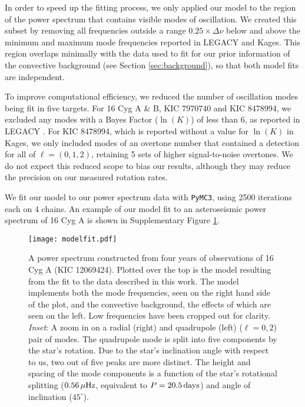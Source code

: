 In order to speed up the fitting process, we only applied our model to the region of the power spectrum that contains visible modes of oscillation. We created this subset by removing all frequencies outside a range $0.25 \times \Delta\nu$ below and above the minimum and maximum mode frequencies reported in LEGACY and Kages. This region overlaps minimally with the data used to fit for our prior information of the convective background (see Section \ref{sec:background}), so that both model fits are independent.

To improve computational efficiency, we reduced the number of oscillation modes being fit in five targets. For 16 Cyg A \& B, KIC 7970740 and KIC 8478994, we excluded any modes with a Bayes Factor ($\ln(K)$) of less than 6, as reported in LEGACY \cite{davies+2016,lund+2017,kass+raftery1995}. For KIC 8478994, which is reported without a value for $\ln(K)$ in Kages, we only included modes of an overtone number that contained a detection for all of $\ell = (0, 1, 2)$, retaining 5 sets of higher signal-to-noise overtones. We do not expect this reduced scope to bias our results, although they may reduce the precision on our measured rotation rates.

We fit our model to our power spectrum data with \texttt{PyMC3}, using 2500 iterations each on 4 chains. An example of our model fit to an asteroseismic power spectrum of 16 Cyg A is shown in Supplementary Figure \ref{fig:modelfit}.

 \begin{figure}
	\centering
	\texttt{[image: modelfit.pdf]}
	\caption{A power spectrum constructed from four years of \kepler observations of 16 Cyg A (KIC 12069424). Plotted over the top is the model resulting from the fit to the data described in this work. The model implements both the mode frequencies, seen on the right hand side of the plot, and the convective background, the effects of which are seen on the left. Low frequencies have been cropped out for clarity. \textit{Inset}: A zoom in on a radial (right) and quadrupole (left) ($\ell = 0, 2$) pair of modes. The quadrupole mode is split into five components by the star's rotation. Due to the star's inclination angle with respect to us, two out of five peaks are more distinct. The height and spacing of the mode components is a function of the star's rotational splitting ($0.56\, \mu\rm{Hz}$, equivalent to $P = 20.5\, \rm{days}$) and angle of inclination ($45^\circ$).}
	\label{fig:modelfit}
\end{figure}



